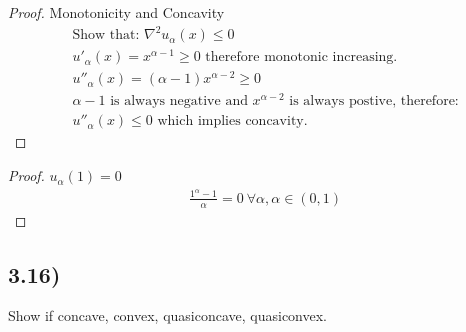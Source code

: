 \documentclass[12pt]{article}
\begin{document}
\begin{proof}{Monotonicity and Concavity}
\begin{align*} 
& \text{Show that: } \nabla^2u_\alpha(x) \le 0 \\
& u'_\alpha(x) = x^{\alpha - 1} \ge 0 \text{ therefore monotonic increasing.} \\
& u''_\alpha(x) = (\alpha - 1)x^{\alpha - 2} \ge 0\\
& \alpha - 1 \text{ is always negative and } x^{\alpha - 2} \text{ is always postive, therefore:}\\
& u''_\alpha(x) \le 0 \text{ which implies concavity.}
\end{align*}
\end{proof}
\begin{proof}{$u_\alpha(1) = 0$}
\begin{align*} 
& \frac{1^\alpha - 1}{\alpha} = 0\ \forall \alpha, \alpha \in (0, 1)  
\end{align*}
\end{proof}

\subsection*{3.16)}
Show if concave, convex, quasiconcave, quasiconvex.
\end{document}
